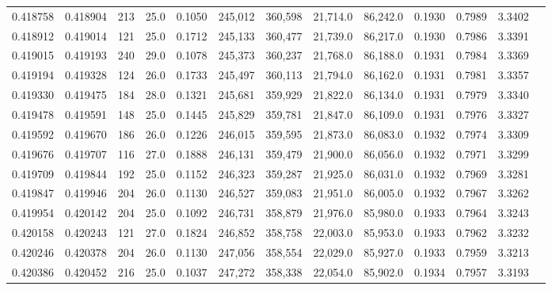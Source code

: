 \begin{tabular}{rrrrrrrrrrrrr}
0.418758 & 0.418904 &   213 & 25.0 &                                     0.1050 & 245,012 & 360,598 &  21,714.0 &  86,242.0 & 0.1930 & 0.7989 & 3.3402 \\
0.418912 & 0.419014 &   121 & 25.0 &                                     0.1712 & 245,133 & 360,477 &  21,739.0 &  86,217.0 & 0.1930 & 0.7986 & 3.3391 \\
0.419015 & 0.419193 &   240 & 29.0 &                                     0.1078 & 245,373 & 360,237 &  21,768.0 &  86,188.0 & 0.1931 & 0.7984 & 3.3369 \\
0.419194 & 0.419328 &   124 & 26.0 &                                     0.1733 & 245,497 & 360,113 &  21,794.0 &  86,162.0 & 0.1931 & 0.7981 & 3.3357 \\
0.419330 & 0.419475 &   184 & 28.0 &                                     0.1321 & 245,681 & 359,929 &  21,822.0 &  86,134.0 & 0.1931 & 0.7979 & 3.3340 \\
0.419478 & 0.419591 &   148 & 25.0 &                                     0.1445 & 245,829 & 359,781 &  21,847.0 &  86,109.0 & 0.1931 & 0.7976 & 3.3327 \\
0.419592 & 0.419670 &   186 & 26.0 &                                     0.1226 & 246,015 & 359,595 &  21,873.0 &  86,083.0 & 0.1932 & 0.7974 & 3.3309 \\
0.419676 & 0.419707 &   116 & 27.0 &                                     0.1888 & 246,131 & 359,479 &  21,900.0 &  86,056.0 & 0.1932 & 0.7971 & 3.3299 \\
0.419709 & 0.419844 &   192 & 25.0 &                                     0.1152 & 246,323 & 359,287 &  21,925.0 &  86,031.0 & 0.1932 & 0.7969 & 3.3281 \\
0.419847 & 0.419946 &   204 & 26.0 &                                     0.1130 & 246,527 & 359,083 &  21,951.0 &  86,005.0 & 0.1932 & 0.7967 & 3.3262 \\
0.419954 & 0.420142 &   204 & 25.0 &                                     0.1092 & 246,731 & 358,879 &  21,976.0 &  85,980.0 & 0.1933 & 0.7964 & 3.3243 \\
0.420158 & 0.420243 &   121 & 27.0 &                                     0.1824 & 246,852 & 358,758 &  22,003.0 &  85,953.0 & 0.1933 & 0.7962 & 3.3232 \\
0.420246 & 0.420378 &   204 & 26.0 &                                     0.1130 & 247,056 & 358,554 &  22,029.0 &  85,927.0 & 0.1933 & 0.7959 & 3.3213 \\
0.420386 & 0.420452 &   216 & 25.0 &                                     0.1037 & 247,272 & 358,338 &  22,054.0 &  85,902.0 & 0.1934 & 0.7957 & 3.3193 \\

\end{tabular}
